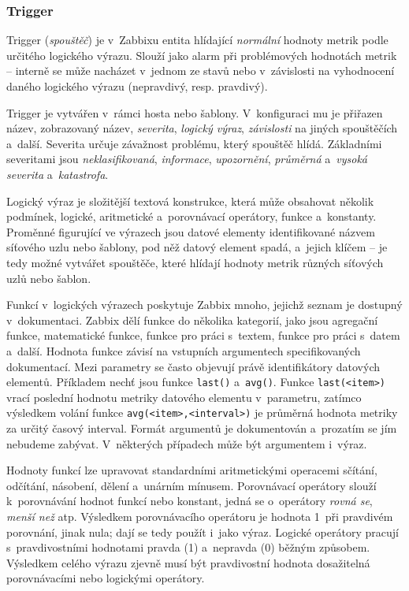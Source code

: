 \documentclass[czech, ing, kiv, he, iso690]{fasthesis}
\begin{document}
\subsubsection{Trigger}
Trigger (\emph{spouštěč}) je v~Zabbixu entita hlídající \emph{normální} hodnoty metrik podle určitého logického výrazu. Slouží jako alarm při problémových hodnotách metrik -- interně se může nacházet v~jednom ze stavů  nebo  v~závislosti na vyhodnocení daného logického výrazu (nepravdivý, resp. pravdivý).

Trigger je vytvářen v~rámci hosta nebo šablony. V~konfiguraci mu je přiřazen název, zobrazovaný název, \emph{severita}, \emph{logický výraz}, \emph{závislosti} na jiných spouštěčích a~další. Severita určuje závažnost problému, který spouštěč hlídá. Základními severitami jsou \emph{neklasifikovaná}, \emph{informace}, \emph{upozornění}, \emph{průměrná} a~\emph{vysoká severita} a~\emph{katastrofa}. 

Logický výraz je složitější textová konstrukce, která může obsahovat několik podmínek, logické, aritmetické a~porovnávací operátory, funkce a~konstanty. Proměnné figurující ve výrazech jsou datové elementy identifikované názvem síťového uzlu nebo šablony, pod něž datový element spadá, a~jejich klíčem -- je tedy možné vytvářet spouštěče, které hlídají hodnoty metrik různých síťových uzlů nebo šablon. 

Funkcí v~logických výrazech poskytuje Zabbix mnoho, jejichž seznam je dostupný v~dokumentaci. Zabbix dělí funkce do několika kategorií, jako jsou agregační funkce, matematické funkce, funkce pro práci s~textem, funkce pro práci s~datem a~další. Hodnota funkce závisí na vstupních argumentech specifikovaných dokumentací. Mezi parametry se často objevují právě identifikátory datových elementů. Příkladem nechť jsou funkce \texttt{last()} a~\texttt{avg()}. Funkce \texttt{last(<item>)} vrací poslední hodnotu metriky datového elementu v~parametru, zatímco výsledkem volání funkce \texttt{avg(<item>,<interval>)} je průměrná hodnota metriky za určitý časový interval. Formát argumentů je dokumentován a~prozatím se jím nebudeme zabývat. V~některých případech může být argumentem i~výraz.

Hodnoty funkcí lze upravovat standardními aritmetickými operacemi sčítání, odčítání, násobení, dělení a~unárním mínusem. Porovnávací operátory slouží k~porovnávání hodnot funkcí nebo konstant, jedná se o~operátory \emph{rovná se}, \emph{menší než} atp. Výsledkem porovnávacího operátoru je hodnota 1~při pravdivém porovnání, jinak nula; dají se tedy použít i~jako výraz. Logické operátory pracují s~pravdivostními hodnotami pravda (1) a~nepravda (0) běžným způsobem. Výsledkem celého výrazu zjevně musí být pravdivostní hodnota dosažitelná porovnávacími nebo logickými operátory.
\end{document}
